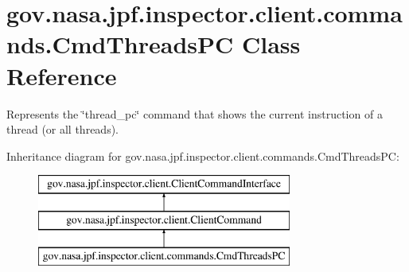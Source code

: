 \hypertarget{classgov_1_1nasa_1_1jpf_1_1inspector_1_1client_1_1commands_1_1_cmd_threads_p_c}{}\section{gov.\+nasa.\+jpf.\+inspector.\+client.\+commands.\+Cmd\+Threads\+PC Class Reference}
\label{classgov_1_1nasa_1_1jpf_1_1inspector_1_1client_1_1commands_1_1_cmd_threads_p_c}


Represents the \char`\"{}thread\+\_\+pc\char`\"{} command that shows the current instruction of a thread (or all threads).  


Inheritance diagram for gov.\+nasa.\+jpf.\+inspector.\+client.\+commands.\+Cmd\+Threads\+PC\+:\begin{figure}[H]
\begin{center}
\leavevmode
\includegraphics[height=3.000000cm]{classgov_1_1nasa_1_1jpf_1_1inspector_1_1client_1_1commands_1_1_cmd_threads_p_c}
\end{center}
\end{figure}
